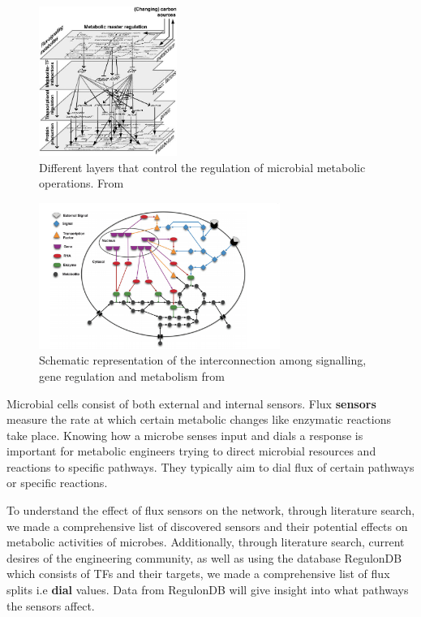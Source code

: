 \documentclass[12pt,chapterheads]{ucsd}
\begin{document}
\begin{figure}[h] 
\centering
\includegraphics[width=0.4\textwidth]{Figures/metabolic_reg}
\caption[Different layers that control the regulation of microbial metabolic operations]
{Different layers that control the regulation of microbial metabolic operations. From \cite{Kotte2010}}
\label{fig:mlayers}
\end{figure}

\begin{figure}[h] 
\centering
\includegraphics[width=0.7\textwidth]{Figures/regulatory_network}
\caption[Schematic representation of the interconnection among signalling, gene regulation and metabolism]
{Schematic representation of the interconnection among signalling, gene regulation and metabolism from \cite{C3MB25489E}}
\label{fig:reg_net}
\end{figure}

Microbial cells consist of both external and internal sensors. Flux \textbf{sensors} measure the rate at which certain metabolic changes like enzymatic reactions take place. Knowing how a microbe senses input and dials a response is important for metabolic engineers trying to direct microbial resources and reactions to specific pathways. They typically aim to dial flux of certain pathways or specific reactions. 

To understand the effect of flux sensors on the network, through literature search, we made a comprehensive list of discovered sensors and their potential effects on metabolic activities of microbes. Additionally, through literature search, current desires of the engineering community, as well as using the database RegulonDB \cite{doi:10.1093/nar/gkv1156} which consists of TFs and their targets, we made a comprehensive list of flux splits i.e \textbf{dial} values. Data from RegulonDB will give insight into what pathways the sensors affect.
\end{document}
